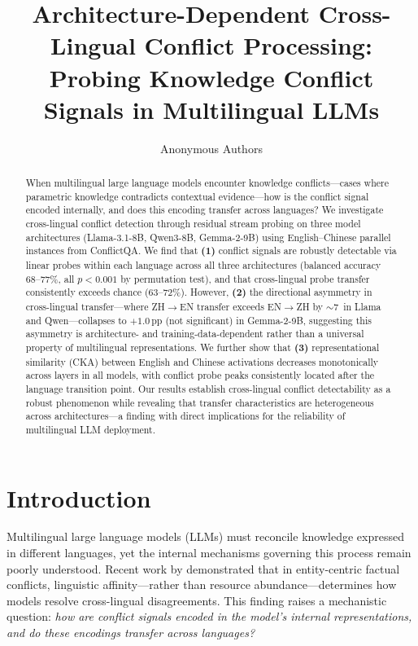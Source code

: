 \documentclass[11pt]{article}
\title{Architecture-Dependent Cross-Lingual Conflict Processing:\\Probing Knowledge Conflict Signals in Multilingual LLMs}
\author{
Anonymous Authors
}
\newcommand{\pp}{\,\text{pp}}
\begin{document}
\maketitle

\begin{abstract}
When multilingual large language models encounter knowledge conflicts---cases where parametric knowledge contradicts contextual evidence---how is the conflict signal encoded internally, and does this encoding transfer across languages?
We investigate cross-lingual conflict detection through residual stream probing on three model architectures (Llama-3.1-8B, Qwen3-8B, Gemma-2-9B) using English--Chinese parallel instances from ConflictQA.
We find that \textbf{(1)} conflict signals are robustly detectable via linear probes within each language across all three architectures (balanced accuracy 68--77\%, all $p < 0.001$ by permutation test), and that cross-lingual probe transfer consistently exceeds chance (63--72\%).
However, \textbf{(2)} the directional asymmetry in cross-lingual transfer---where ZH$\to$EN transfer exceeds EN$\to$ZH by $\sim$7\pp{} in Llama and Qwen---collapses to $+1.0\pp$ (not significant) in Gemma-2-9B, suggesting this asymmetry is architecture- and training-data-dependent rather than a universal property of multilingual representations.
We further show that \textbf{(3)} representational similarity (CKA) between English and Chinese activations decreases monotonically across layers in all models, with conflict probe peaks consistently located after the language transition point.
Our results establish cross-lingual conflict detectability as a robust phenomenon while revealing that transfer characteristics are heterogeneous across architectures---a finding with direct implications for the reliability of multilingual LLM deployment.
\end{abstract}

\section{Introduction}

Multilingual large language models (LLMs) must reconcile knowledge expressed in different languages, yet the internal mechanisms governing this process remain poorly understood.
Recent work by \citet{zhao2026clear} demonstrated that in entity-centric factual conflicts, linguistic affinity---rather than resource abundance---determines how models resolve cross-lingual disagreements.
This finding raises a mechanistic question: \emph{how are conflict signals encoded in the model's internal representations, and do these encodings transfer across languages?}
\end{document}
